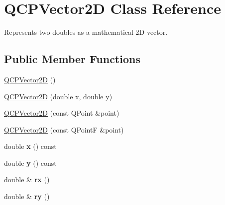\hypertarget{classQCPVector2D}{}\section{Q\+C\+P\+Vector2D Class Reference}
\label{classQCPVector2D}


Represents two doubles as a mathematical 2D vector.  


\subsection*{Public Member Functions}
\begin{DoxyCompactItemize}
\item 
\hyperlink{classQCPVector2D_a04c90748c3623044c79fa20788ffbcc6}{Q\+C\+P\+Vector2D} ()
\item 
\hyperlink{classQCPVector2D_a47bd86cebc5588dad6ec84349d9098d4}{Q\+C\+P\+Vector2D} (double x, double y)
\item 
\hyperlink{classQCPVector2D_ad8f30a064dc37c90a7ba5e6732ceb5bb}{Q\+C\+P\+Vector2D} (const Q\+Point \&point)
\item 
\hyperlink{classQCPVector2D_a3c16eba1006c210ffc3299253fef2339}{Q\+C\+P\+Vector2D} (const Q\+PointF \&point)
\item 
double {\bfseries x} () const \hypertarget{classQCPVector2D_a731b487c2bf4afb5c51937619a27d49e}{}\label{classQCPVector2D_a731b487c2bf4afb5c51937619a27d49e}

\item 
double {\bfseries y} () const \hypertarget{classQCPVector2D_a9755d2fbdf959198b394b1ec5a7d022e}{}\label{classQCPVector2D_a9755d2fbdf959198b394b1ec5a7d022e}

\item 
double \& {\bfseries rx} ()\hypertarget{classQCPVector2D_a1516252dac9eb5ffb7ddb17fb26e60e0}{}\label{classQCPVector2D_a1516252dac9eb5ffb7ddb17fb26e60e0}

\item 
double \& {\bfseries ry} ()\hypertarget{classQCPVector2D_aa8f59a5b54aec8be8e4d1f39db892fea}{}\label{classQCPVector2D_aa8f59a5b54aec8be8e4d1f39db892fea}


\end{DoxyCompactItemize}
